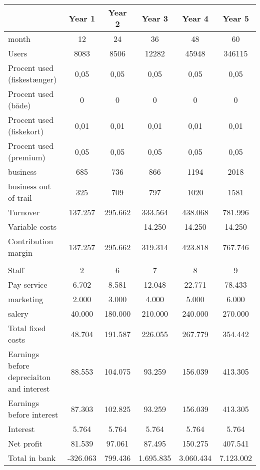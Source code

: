 \begin{tabular}{|l|c|c|c|c|c|}
\hline
\rowcolor[HTML]{C0C0C0}  & Year 1 & Year 2 & Year 3 & Year 4 & Year 5 \\ \hline
month & 12 & 24 & 36 & 48 & 60 \\ \hline
\rowcolor[HTML]{C0C0C0} Users & 8083 & 8506 & 12282 & 45948 & 346115 \\ \hline
Procent used (fiskestænger) & 0,05 & 0,05 & 0,05 & 0,05 & 0,05 \\ \hline
\rowcolor[HTML]{C0C0C0} Procent used (både) & 0 & 0 & 0 & 0 & 0 \\ \hline
Procent used (fiskekort) & 0,01 & 0,01 & 0,01 & 0,01 & 0,01 \\ \hline
\rowcolor[HTML]{C0C0C0} Procent used (premium) & 0,05 & 0,05 & 0,05 & 0,05 & 0,05 \\ \hline
business & 685 & 736 & 866 & 1194 & 2018 \\ \hline
\rowcolor[HTML]{C0C0C0} business out of trail & 325 & 709 & 797 & 1020 & 1581 \\ \hline \hline
Turnover & 137.257 & 295.662 & 333.564 & 438.068 & 781.996 \\ \hline
\rowcolor[HTML]{C0C0C0} Variable costs &  &  & 14.250 & 14.250 & 14.250 \\ \hline
Contribution margin & 137.257 & 295.662 & 319.314 & 423.818 & 767.746 \\ \hline \hline
\rowcolor[HTML]{C0C0C0} \multicolumn{6}{|l|}{Fixed cost} \\ \hline
Staff & 2 & 6 & 7 & 8 & 9 \\ \hline
\rowcolor[HTML]{C0C0C0} Pay service & 6.702 & 8.581 & 12.048 & 22.771 & 78.433 \\ \hline
marketing & 2.000 & 3.000 & 4.000 & 5.000 & 6.000 \\ \hline
\rowcolor[HTML]{C0C0C0} salery & 40.000 & 180.000 & 210.000 & 240.000 & 270.000 \\ \hline
Total fixed costs & 48.704 & 191.587 & 226.055 & 267.779 & 354.442 \\ \hline \hline
\rowcolor[HTML]{C0C0C0} Earnings before depreciaiton and interest & 88.553 & 104.075 & 93.259 & 156.039 & 413.305 \\ \hline \hline
Earnings before interest & 87.303 & 102.825 & 93.259 & 156.039 & 413.305 \\ \hline \hline
\rowcolor[HTML]{C0C0C0} Interest & 5.764 & 5.764 & 5.764 & 5.764 & 5.764 \\ \hline \hline
Net profit & 81.539 & 97.061 & 87.495 & 150.275 & 407.541 \\ \hline
\rowcolor[HTML]{C0C0C0} Total in bank & -326.063 & 799.436 & 1.695.835 & 3.060.434 & 7.123.002 \\ \hline
\end{tabular}

